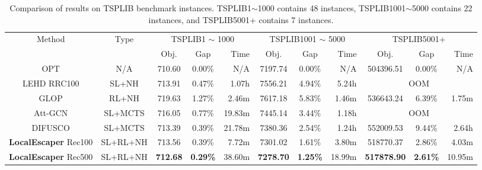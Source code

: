 \begin{table*}
\caption{Comparison of results on TSPLIB benchmark instances. TSPLIB1$\sim$1000 contains 48 instances, TSPLIB1001$\sim$5000 contains 22 instances, and TSPLIB5001+ contains 7 instances.}
\label{Table: TSPLIB}
\centering
\resizebox{1.0\linewidth}{!}
{
\begin{tabular}{cc|ccr|ccr|ccr}
\toprule
\multirow{2}{*}{Method} & \multirow{2}{*}{Type}
& \multicolumn{3}{c|}{TSPLIB1 $\sim$ 1000} & \multicolumn{3}{c|}{TSPLIB1001 $\sim$ 5000} & \multicolumn{3}{c}{TSPLIB5001+} \\
&&Obj.&Gap&Time&Obj.&Gap&Time&Obj.&Gap&Time \\
\midrule

OPT & N/A & 710.60 & 0.00\% & N/A & 7197.74 & 0.00\% & N/A & 504396.51 & 0.00\% & N/A \\


LEHD RRC100 & SL+NH & 713.91 & 0.47\% & 1.07h  &7556.21 &4.94\% &5.24h &\multicolumn{3}{c}{OOM} \\

GLOP & RL+NH & 719.63 & 1.27\% & 2.46m & 7617.18 & 5.83\% & 1.46m & 536643.24 & 6.39\% & 1.75m \\

Att-GCN & SL+MCTS & 716.05 & 0.77\% & 19.83m & 7445.14 & 3.44\% & 1.18h &\multicolumn{3}{c}{OOM} \\

DIFUSCO & SL+MCTS & 713.39 & 0.39\% & 21.78m & 7380.36 & 2.54\% & 1.24h & 552009.53 & 9.44\% & 2.64h \\

\textbf{LocalEscaper} Rec100 & SL+RL+NH &713.56 &0.39\% &7.72m  &7301.02 &1.61\% &3.80m  &518770.37 &2.86\% &4.03m \\

\textbf{LocalEscaper} Rec500 & SL+RL+NH &\textbf{712.68} &\textbf{0.29\%} &38.60m  &\textbf{7278.70} &\textbf{1.25\%} &18.99m  &\textbf{517878.90} &\textbf{2.61\%} &10.95m \\

\bottomrule
\end{tabular}
}



\end{table*}
